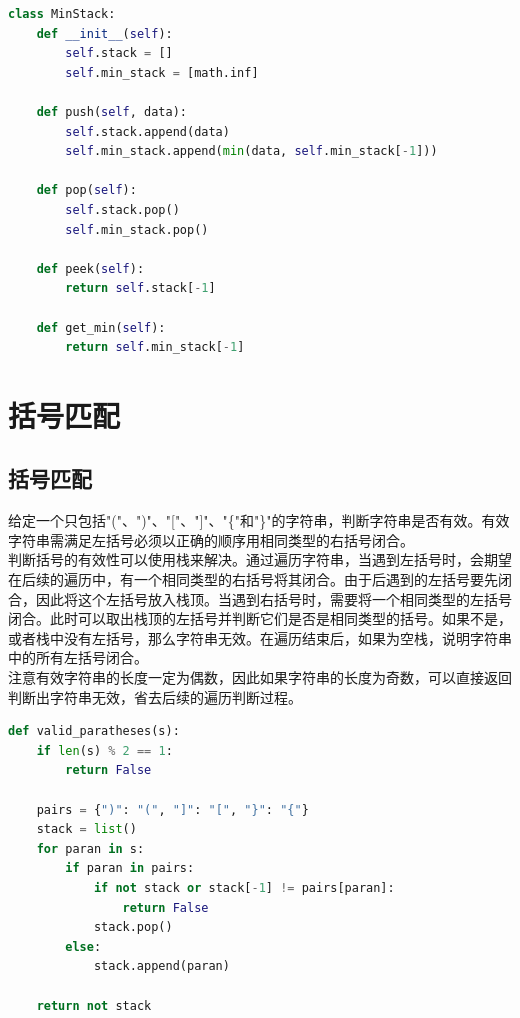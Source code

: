 \begin{lstlisting}[language=Python]
class MinStack:
    def __init__(self):
        self.stack = []
        self.min_stack = [math.inf]
    
    def push(self, data):
        self.stack.append(data)
        self.min_stack.append(min(data, self.min_stack[-1]))
    
    def pop(self):
        self.stack.pop()
        self.min_stack.pop()
    
    def peek(self):
        return self.stack[-1]
    
    def get_min(self):
        return self.min_stack[-1]
\end{lstlisting}

\newpage

\section{括号匹配}

\subsection{括号匹配}

给定一个只包括"("、")"、"["、"]"、"\{"和"\}"的字符串，判断字符串是否有效。有效字符串需满足左括号必须以正确的顺序用相同类型的右括号闭合。\\

判断括号的有效性可以使用栈来解决。通过遍历字符串，当遇到左括号时，会期望在后续的遍历中，有一个相同类型的右括号将其闭合。由于后遇到的左括号要先闭合，因此将这个左括号放入栈顶。当遇到右括号时，需要将一个相同类型的左括号闭合。此时可以取出栈顶的左括号并判断它们是否是相同类型的括号。如果不是，或者栈中没有左括号，那么字符串无效。在遍历结束后，如果为空栈，说明字符串中的所有左括号闭合。\\

注意有效字符串的长度一定为偶数，因此如果字符串的长度为奇数，可以直接返回判断出字符串无效，省去后续的遍历判断过程。\\


\begin{lstlisting}[language=Python]
def valid_paratheses(s):
    if len(s) % 2 == 1:
        return False
    
    pairs = {")": "(", "]": "[", "}": "{"}
    stack = list()
    for paran in s:
        if paran in pairs:
            if not stack or stack[-1] != pairs[paran]:
                return False
            stack.pop()
        else:
            stack.append(paran)

    return not stack
\end{lstlisting}

